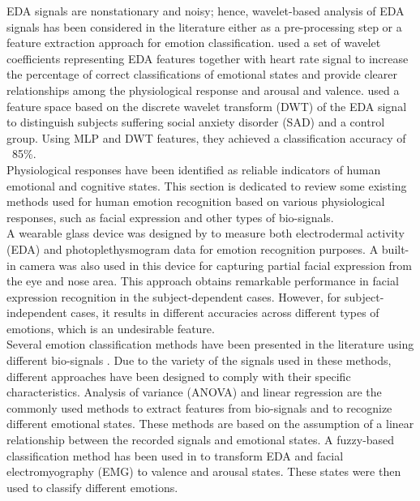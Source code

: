 \documentclass[conference]{IEEEtran}
\begin{document}
EDA signals are nonstationary and noisy; hence, wavelet-based analysis of EDA signals 
has been considered in the literature \cite{EmotionalState2013, EMGGSR2009}
either as a pre-processing step or a feature extraction approach for emotion classification. 
\cite{EmotionalState2013} used a set of wavelet coefficients representing EDA features 
together with heart rate signal to increase the percentage of correct classifications 
of emotional states and provide clearer relationships among the physiological response 
and arousal and valence. \cite{EDA2016} used a feature space based on the 
discrete wavelet transform (DWT) of the EDA signal to distinguish subjects suffering 
social anxiety disorder (SAD) and a control group. Using MLP and DWT features, they 
achieved a classification accuracy of ~85\%.
\\

Physiological responses have been identified as reliable indicators of human emotional 
and cognitive states. This section is dedicated to review some existing methods used for 
human emotion recognition based on various physiological responses, such as facial 
expression and other types of bio-signals. \\

A wearable glass device was designed by \cite{WearableDevice2016} to measure both electrodermal 
activity (EDA) and photoplethysmogram data for emotion recognition purposes. A built-in 
camera was also used in this device for capturing partial facial expression from the eye 
and nose area. This approach obtains remarkable performance in facial expression 
recognition in the subject-dependent cases. However, for subject-independent cases, 
it results in different accuracies across different types of emotions, which is an 
undesirable feature. \\

Several emotion classification methods have been presented in the literature using 
different bio-signals \cite{EmotionInten2014, EmotionResp2013, ElectAct2000, HeteroKnow2016}. 
Due to the variety of the signals used in these methods, 
different approaches have been designed to comply with their specific characteristics. 
Analysis of variance (ANOVA) and linear regression \cite{ElectAct2000} are the 
commonly used methods to extract features from bio-signals and to recognize different 
emotional states. These methods are based on the assumption of a linear relationship 
between the recorded signals and emotional states. A fuzzy-based classification 
method \cite{EmotionInten2014} has been used in to transform EDA and facial 
electromyography (EMG) to valence and arousal states. These states were then used 
to classify different emotions. \\
\end{document}
